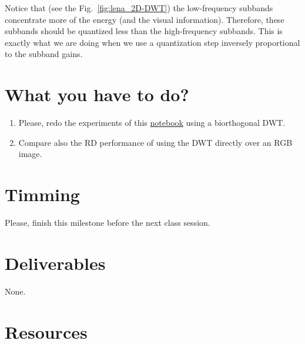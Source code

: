 Notice that (see the Fig.~\ref{fig:lena_2D-DWT}) the low-frequency
subbands concentrate more of the energy (and the visual
information). Therefore, these subbands should be quantized less than
the high-frequency subbands. This is exactly what we are doing when we
use a quantization step inversely proportional to the subband gains.

\section{What you have to do?}

\begin{enumerate}
\item Please, redo the experiments of this
  \href{https://github.com/Sistemas-Multimedia/Sistemas-Multimedia.github.io/blob/master/milestones/08-2D-DWT/performance.ipynb}{notebook}
  using a biorthogonal DWT.
\item Compare also the RD performance of using the DWT directly over an RGB image.
\end{enumerate}

\section{Timming}

Please, finish this milestone before the next class session.

\section{Deliverables}

None.

\section{Resources}


